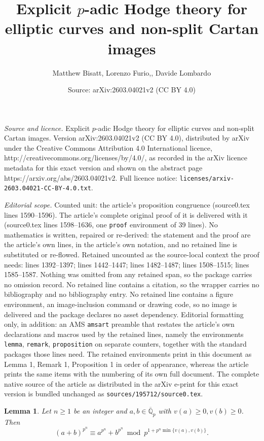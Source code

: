 \documentclass[10pt,a4paper]{amsart}
\title{Explicit $p$-adic Hodge theory for elliptic curves and non-split Cartan images}
\author{Matthew Bisatt, Lorenzo Furio,, Davide Lombardo}
\date{Source: arXiv:2603.04021v2 (CC BY 4.0)}
\newtheorem{lemma}{Lemma}
\newcommand{\Q}{\mathbb{Q}}
\begin{document}
\maketitle

\noindent\emph{Source and licence.} Explicit $p$-adic Hodge theory for elliptic curves and non-split Cartan images. Version arXiv:2603.04021v2 (CC BY 4.0), distributed by arXiv under the Creative Commons Attribution 4.0 International licence, http://creativecommons.org/licenses/by/4.0/, as recorded in the arXiv licence metadata for this exact version and shown on the abstract page https://arxiv.org/abs/2603.04021v2. Full licence notice: \texttt{licenses/arxiv-2603.04021-CC-BY-4.0.txt}.\par\smallskip

\noindent\textit{Editorial scope.} Counted unit: the article's proposition congruence (source0.tex lines 1590--1596). The article's complete original proof of it is delivered with it (source0.tex lines 1598--1636, one \texttt{proof} environment of 39 lines). No mathematics is written, repaired or re-derived: the statement and the proof are the article's own lines, in the article's own notation, and no retained line is substituted or re-flowed.  Retained uncounted as the source-local context the proof needs: lines 1392--1397; lines 1442--1447; lines 1482--1487; lines 1508--1515; lines 1585--1587.  Nothing was omitted from any retained span, so the package carries no omission record.  No retained line contains a citation, so the wrapper carries no bibliography and no bibliography entry.  No retained line contains a figure environment, an image-inclusion command or drawing code, so no image is delivered and the package declares no asset dependency.  Editorial formatting only, in addition: an AMS \texttt{amsart} preamble that restates the article's own declarations and macros used by the retained lines, namely the environments \texttt{lemma}, \texttt{remark}, \texttt{proposition} on separate counters, together with the standard packages those lines need.  The retained environments print in this document as Lemma 1, Remark 1, Proposition 1 in order of appearance, whereas the article prints the same items with the numbering of its own full document.  The complete native source of the article as distributed in the arXiv e-print for this exact version is bundled unchanged as \texttt{sources/195712/source0.tex}.
\begin{lemma}\label{lemma: freshmans dream}
Let $n\geq 1$ be an integer and $a,b \in \overline{\Q}_p$ with $v(a) \geq 0, v(b) \geq 0$. Then
\[
(a+b)^{p^n} \equiv a^{p^n}+b^{p^n} \bmod p^{ 1 + p^n \min\{v(a), v(b)\}}.
\]
\end{lemma}
\end{document}
